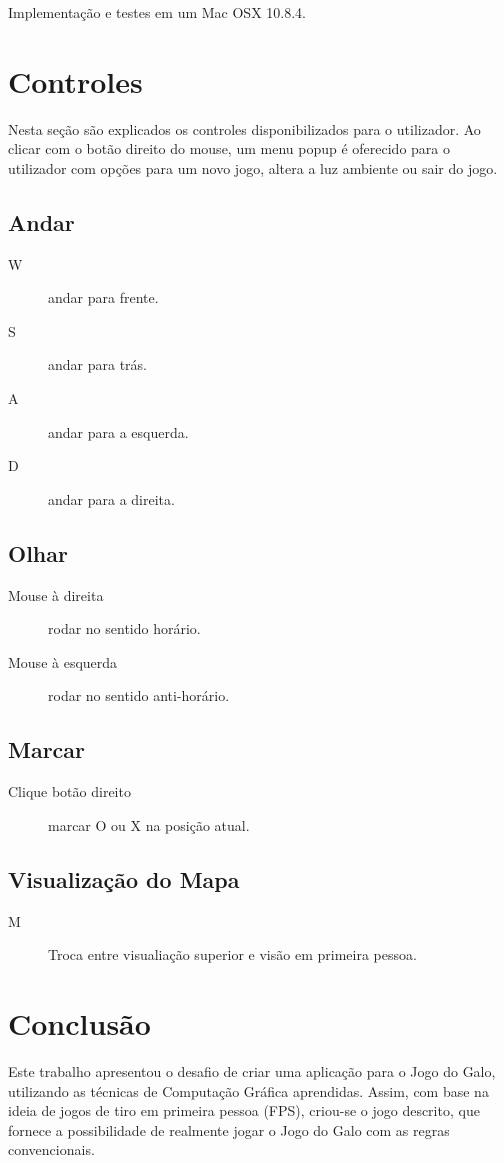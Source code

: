 \documentclass[12pt, onecolumn]{article}
\begin{document}
Implementa\c{c}\~ao e testes em um Mac OSX 10.8.4.

\section{Controles}

Nesta se\c{c}\~ao s\~ao explicados os controles disponibilizados para o utilizador. Ao clicar com o bot\~ao direito do mouse, um menu popup \'e oferecido para o utilizador com op\c{c}\~oes para um novo jogo, altera a luz ambiente ou sair do jogo.

\subsection{Andar}
\begin{description}
  \item[W] andar para frente.
  \item[S] andar para tr\'as.
  \item[A] andar para a esquerda.
  \item[D] andar para a direita.
\end{description}

\subsection{Olhar}
\begin{description}
  \item[Mouse \`a direita] rodar no sentido hor\'ario.
  \item[Mouse \`a esquerda] rodar no sentido anti-hor\'ario.
\end{description}

\subsection{Marcar}
\begin{description}
  \item[Clique bot\~ao direito] marcar O ou X na posi\c{c}\~ao atual.
\end{description}

\subsection{Visualiza\c{c}\~ao do Mapa}

\begin{description}
  \item[M] Troca entre visualia\c{c}\~ao superior e vis\~ao em primeira pessoa.
\end{description}

\section{Conclus\~ao}

Este trabalho apresentou o desafio de criar uma aplica\c{c}\~ao para o Jogo do Galo, utilizando as t\'ecnicas de Computa\c{c}\~ao Gr\'afica aprendidas. Assim, com base na ideia de jogos de tiro em primeira pessoa (FPS), criou-se o jogo descrito, que fornece a possibilidade de realmente jogar o Jogo do Galo com as regras convencionais.
\end{document}
